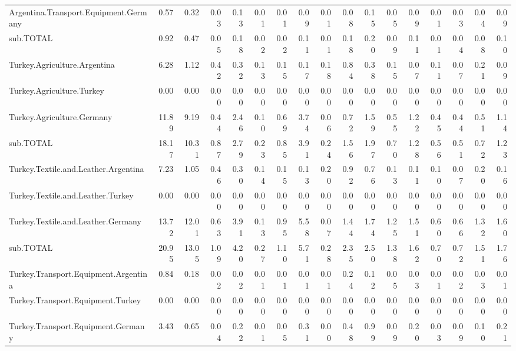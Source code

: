 \documentclass[a4paper,11pt]{article}
\begin{document}
\begin{sidewaystable}[htbp]
\begin{tabular}{lrrrrrrrrrrrrrrrr}
    Argentina.Transport.Equipment.Germany & 0.57  & 0.32  & 0.03  & 0.13  & 0.01  & 0.01  & 0.09  & 0.01  & 0.08  & 0.15  & 0.05  & 0.09  & 0.01  & 0.03  & 0.04  & 0.09 \\
    sub.TOTAL & 0.92  & 0.47  & 0.05  & 0.18  & 0.02  & 0.02  & 0.11  & 0.01  & 0.18  & 0.20  & 0.09  & 0.11  & 0.01  & 0.04  & 0.08  & 0.10 \\
    Turkey.Agriculture.Argentina & 6.28  & 1.12  & 0.42  & 0.32  & 0.13  & 0.15  & 0.17  & 0.18  & 0.84  & 0.38  & 0.15  & 0.07  & 0.11  & 0.07  & 0.21  & 0.09 \\
    Turkey.Agriculture.Turkey & 0.00  & 0.00  & 0.00  & 0.00  & 0.00  & 0.00  & 0.00  & 0.00  & 0.00  & 0.00  & 0.00  & 0.00  & 0.00  & 0.00  & 0.00  & 0.00 \\
    Turkey.Agriculture.Germany & 11.89 & 9.19  & 0.44  & 2.46  & 0.10  & 0.69  & 3.74  & 0.06  & 0.72  & 1.59  & 0.55  & 1.22  & 0.45  & 0.44  & 0.51  & 1.14 \\
    sub.TOTAL & 18.17 & 10.31 & 0.87  & 2.79  & 0.23  & 0.85  & 3.91  & 0.24  & 1.56  & 1.97  & 0.70  & 1.28  & 0.56  & 0.51  & 0.72  & 1.23 \\
    Turkey.Textile.and.Leather.Argentina & 7.23  & 1.05  & 0.46  & 0.30  & 0.14  & 0.15  & 0.13  & 0.20  & 0.92  & 0.76  & 0.13  & 0.11  & 0.10  & 0.07  & 0.20  & 0.16 \\
    Turkey.Textile.and.Leather.Turkey & 0.00  & 0.00  & 0.00  & 0.00  & 0.00  & 0.00  & 0.00  & 0.00  & 0.00  & 0.00  & 0.00  & 0.00  & 0.00  & 0.00  & 0.00  & 0.00 \\
    Turkey.Textile.and.Leather.Germany & 13.72 & 12.01 & 0.63  & 3.91  & 0.13  & 0.95  & 5.58  & 0.07  & 1.44  & 1.74  & 1.25  & 1.51  & 0.60  & 0.66  & 1.32  & 1.60 \\
    sub.TOTAL & 20.95 & 13.05 & 1.09  & 4.20  & 0.27  & 1.10  & 5.71  & 0.28  & 2.35  & 2.50  & 1.38  & 1.62  & 0.70  & 0.72  & 1.51  & 1.76 \\
    Turkey.Transport.Equipment.Argentina & 0.84  & 0.18  & 0.02  & 0.02  & 0.01  & 0.01  & 0.01  & 0.01  & 0.24  & 0.12  & 0.05  & 0.03  & 0.01  & 0.02  & 0.03  & 0.01 \\
    Turkey.Transport.Equipment.Turkey & 0.00  & 0.00  & 0.00  & 0.00  & 0.00  & 0.00  & 0.00  & 0.00  & 0.00  & 0.00  & 0.00  & 0.00  & 0.00  & 0.00  & 0.00  & 0.00 \\
    Turkey.Transport.Equipment.Germany & 3.43  & 0.65  & 0.04  & 0.22  & 0.01  & 0.05  & 0.31  & 0.00  & 0.48  & 0.99  & 0.09  & 0.20  & 0.03  & 0.09  & 0.10  & 0.21 \\

\end{tabular}
\end{sidewaystable}
\end{document}
